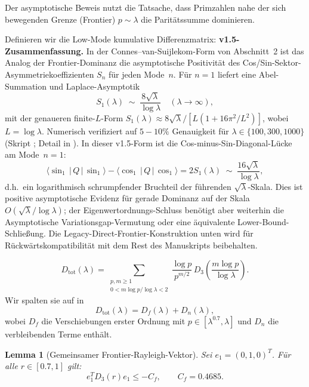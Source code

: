 \documentclass[11pt,a4paper]{article}
\newtheorem{lemma}[lemma]{Lemma}
\theoremstyle{remark}
\theoremstyle{plain}
\begin{document}
Der asymptotische Beweis nutzt die Tatsache, dass Primzahlen nahe der sich bewegenden Grenze (Frontier) $p\sim\lambda$ die Paritätssumme dominieren.

Definieren wir die Low-Mode kumulative Differenzmatrix:
\medskip\noindent\textbf{v1.5-Zusammenfassung.}
In der Connes--van-Suijlekom-Form von Abschnitt~2 ist das Analog der Frontier-Dominanz die asymptotische Positivität des Cos/Sin-Sektor-Asymmetriekoeffizienten $S_n$ für jeden Mode~$n$. Für $n=1$ liefert eine Abel-Summation und Laplace-Asymptotik
\begin{equation}
\label{eq:S1-asymptotic-cvs}
  S_1(\lambda) \;\sim\; \frac{8\sqrt\lambda}{\log\lambda}
  \quad (\lambda\to\infty),
\end{equation}
mit der genaueren finite-$L$-Form $S_1(\lambda) \approx 8\sqrt\lambda/[L(1+16\pi^2/L^2)]$, wobei $L=\log\lambda$. Numerisch verifiziert auf $5{-}10\%$ Genauigkeit für $\lambda\in\{100,300,1000\}$ (Skript ; Detail in ). In dieser v1.5-Form ist die Cos-minus-Sin-Diagonal-Lücke am Mode~$n=1$:
\[
  \langle\sin_1\,|\,Q\,|\,\sin_1\rangle - \langle\cos_1\,|\,Q\,|\,\cos_1\rangle = 2 S_1(\lambda) \;\sim\; \frac{16\sqrt\lambda}{\log\lambda},
\]
d.h.\ ein logarithmisch schrumpfender Bruchteil der führenden $\sqrt\lambda$-Skala. Dies ist positive asymptotische Evidenz für gerade Dominanz auf der Skala $O(\sqrt\lambda/\log\lambda)$; der Eigenwertordnungs-Schluss benötigt aber weiterhin die Asymptotische Variationsgap-Vermutung oder eine äquivalente Lower-Bound-Schließung. Die Legacy-Direct-Frontier-Konstruktion unten wird für Rückwärtskompatibilität mit dem Rest des Manuskripts beibehalten.

\bigskip

\[
  D_{\mathrm{tot}}(\lambda)=
  \sum_{\substack{p,m\geq1\\0<m\log p/\log\lambda<2}}
  \frac{\log p}{p^{m/2}}\,
  D_3\!\left(\frac{m\log p}{\log\lambda}\right).
\]
Wir spalten sie auf in
\[
  D_{\mathrm{tot}}(\lambda)=D_f(\lambda)+D_n(\lambda),
\]
wobei $D_f$ die Verschiebungen erster Ordnung mit $p\in[\lambda^{0.7},\lambda]$ und $D_n$ die verbleibenden Terme enthält.

\begin{lemma}[Gemeinsamer Frontier-Rayleigh-Vektor]
\label{lem:common-vector}
Sei $e_1=(0,1,0)^T$. Für alle $r\in[0.7,1]$ gilt:
\[
  e_1^T D_3(r)e_1\leq -C_f,
  \qquad C_f=0.4685.
\]
\end{lemma}
\end{document}
